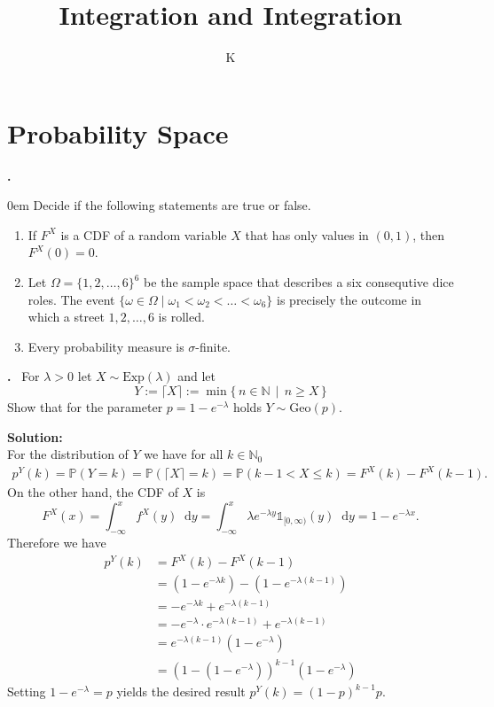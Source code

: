 \documentclass[a4paper]{book}
\title{Integration and Integration}
\author{K}
\theoremstyle{definition}
\newcommand*\diff{\mathop{}\!\mathrm{d}}
\newcounter{problem}
\newcounter{solution}
\newcommand\Problem{%
    \stepcounter{problem}%
    \textbf{\theproblem.}~%
    \setcounter{solution}{0}%
  }
\newcommand\TheSolution{%
    \textbf{Solution:}\\%
  }
\begin{document}
\chapter{Probability Space}

\Problem{
  \parskip 0em
  Decide if the following statements are true or false.
  \begin{enumerate}
    \item If \(F^X\) is a CDF of a random variable \(X\) that has only values in \((0, 1)\), then \(F^X (0) = 0\).
    \item Let \(\Omega = \{1, 2, \ldots, 6\}^6\) be the sample space that describes a six consequtive dice roles. The event \(\{\omega \in \Omega \mid \omega_1 < \omega_2 < \ldots < \omega_6\}\) is precisely the outcome in which a street \(1, 2, \ldots, 6\) is rolled.
    \item Every probability measure is \(\sigma\)-finite.
  \end{enumerate}
}

\Problem{
  For \(\lambda > 0\) let \(X \sim \text{Exp}(\lambda)\) and let
  \begin{equation}
    Y := \lceil{X} \rceil := \min \{\, n \in \mathbb{N} \, \mid \, n \geq X \, \}
  \end{equation}
  Show that for the parameter \(p = 1 - e^{-\lambda}\) holds \(Y \sim \text{Geo}(p)\).
}

\TheSolution{
  For the distribution of \(Y\) we have for all \(k \in \mathbb{N}_0\)
  \begin{align}
    p^Y (k) = \mathbb{P}(Y = k) = \mathbb{P}(\lceil{X} \rceil = k) = \mathbb{P}(k - 1 < X \leq k) = F^X (k) - F^X(k - 1) \text{.}
  \end{align}
  On the other hand, the CDF of \(X\) is
  \begin{equation}
    F^X (x) = \int_{-\infty}^x f^X(y) \diff y = \int_{-\infty}^x \lambda e^{-\lambda y} \mathds{1}_{[0, \infty)}(y) \diff y = 1 - e^{-\lambda x} \text{.}
  \end{equation}
  Therefore we have
  \begin{align}
    p^Y (k) &= F^X (k) - F^X(k - 1) \\
    &= (1 - e^{-\lambda k}) - (1 - e^{-\lambda (k - 1)}) \\
    &= - e^{-\lambda k} + e^{-\lambda (k - 1)} \\
    &= - e^{-\lambda} \cdot e^{-\lambda (k - 1)} + e^{-\lambda (k - 1)} \\
    &= e^{-\lambda (k - 1)} (1 - e^{-\lambda}) \\
    &= \left(1 - \left(1 - e^{-\lambda}\right) \right)^{k - 1} (1 - e^{-\lambda})
  \end{align}
  Setting \(1 - e^{-\lambda} = p\) yields the desired result \(p^Y (k) = \left(1-p\right)^{k-1} p\).
}
\end{document}
